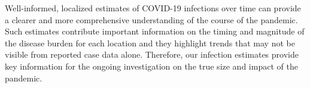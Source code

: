 

Well-informed, localized estimates of COVID-19 infections over time can provide
a clearer and more comprehensive understanding of the course of the pandemic.
Such estimates contribute important information on the timing and magnitude of
the disease burden for each location and they highlight trends that may not be
visible from reported case data alone. Therefore, our infection estimates
provide key information for the ongoing investigation on the true size and impact of
the pandemic.
